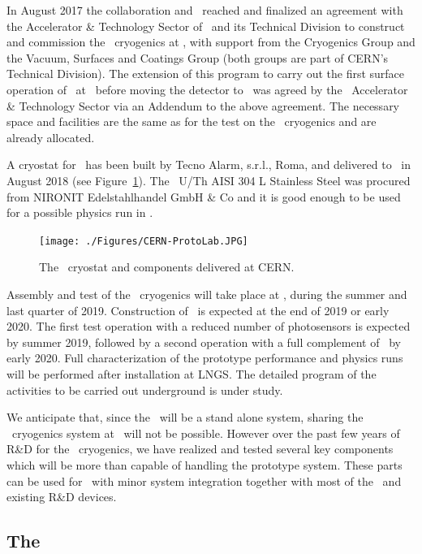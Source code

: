 In August 2017 the collaboration and \LNGS\ reached and finalized an agreement \cite{Mapelli:2017vn} with the Accelerator \& Technology Sector of \CERN\ and its Technical Division to construct and commission the \DSks\ cryogenics at \CERN, with support from the Cryogenics Group and the Vacuum, Surfaces and Coatings Group (both groups are part of CERN's Technical Division). The extension of this program to carry out the first surface operation of \DSps\ at \CERN\ before moving the detector to \LNGS\ was agreed by the \CERN\ Accelerator \& Technology Sector via an Addendum to the above agreement. The necessary space and facilities are the same as for the test on the \DSk\ cryogenics and are already allocated.

A cryostat for \DSps\ has been built by Tecno Alarm, s.r.l., Roma, and delivered to \CERN\ in August 2018 (see Figure~\ref{fig:proto-cern}).  The \DSlCryostatUCont\ U/Th AISI 304 L Stainless Steel was procured from NIRONIT Edelstahlhandel GmbH \& Co and it is good enough to be used for a possible physics run in \LNGS.

\begin{figure}[!t]
\centering
\texttt{[image: ./Figures/CERN-ProtoLab.JPG]}
\caption[The \DSps\ cryostat and components delivered at CERN]{The \DSps\ cryostat and components delivered at CERN.}
\label{fig:proto-cern}
\end{figure}

Assembly and test of the \DSks\ cryogenics will take place at \CERN, during the summer and last quarter of 2019. Construction of \DSps\ is expected at the end of 2019 or early 2020. The first test operation with a reduced number of photosensors is expected by summer 2019, followed by a second operation with a full complement of \DSkPdms\ by early 2020. Full characterization of the prototype performance and physics runs will be performed after installation at LNGS. The detailed program of the activities to be carried out underground is under study.

We anticipate that, since the \DSps\ will be a stand alone system, sharing the \DSks\ cryogenics system at \LNGS\ will not be possible. However over the past few years of R\&D for the \DSks\ cryogenics, we have realized and tested several key components which will be more than capable of handling the prototype system. These parts can be used for \DSps\ with minor system integration together with most of the \DSfs\ and existing R\&D devices.

\subsection{The \DSps\ \TPC}

